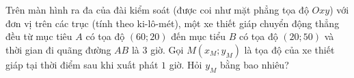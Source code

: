 \begin{bt}%
Trên màn hình ra đa của đài kiểm soát (được coi như mặt phẳng tọa độ $Oxy$) với đơn vị trên các trục (tính theo ki-lô-mét), một xe thiết giáp chuyển động thẳng đều từ mục tiêu $A$ có tọa độ $(60;20)$ đến mục tiểu $B$ có tọa độ $(20;50)$ và thời gian đi quãng đường $AB$ là $3$ giờ. Gọi $M(x_M;y_M)$ là tọa độ của xe thiết giáp tại thời điểm sau khi xuất phát $1$ giờ. Hỏi $y_M$ bằng bao nhiêu? 
\end{bt}

